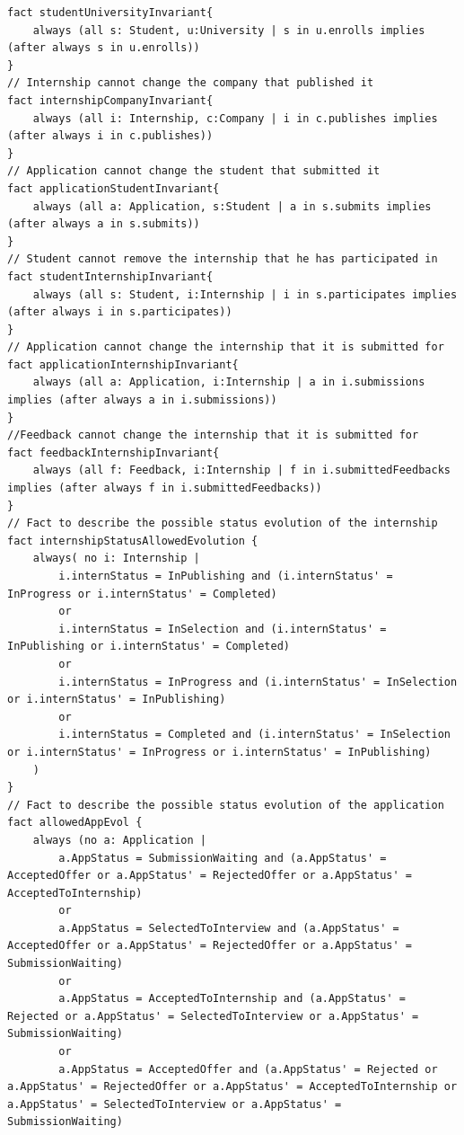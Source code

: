 \begin{lstlisting}
fact studentUniversityInvariant{
    always (all s: Student, u:University | s in u.enrolls implies (after always s in u.enrolls))
}
// Internship cannot change the company that published it
fact internshipCompanyInvariant{
    always (all i: Internship, c:Company | i in c.publishes implies (after always i in c.publishes))
}
// Application cannot change the student that submitted it
fact applicationStudentInvariant{
    always (all a: Application, s:Student | a in s.submits implies (after always a in s.submits))
}
// Student cannot remove the internship that he has participated in
fact studentInternshipInvariant{
    always (all s: Student, i:Internship | i in s.participates implies (after always i in s.participates))
}
// Application cannot change the internship that it is submitted for
fact applicationInternshipInvariant{
    always (all a: Application, i:Internship | a in i.submissions implies (after always a in i.submissions))
}
//Feedback cannot change the internship that it is submitted for
fact feedbackInternshipInvariant{
    always (all f: Feedback, i:Internship | f in i.submittedFeedbacks implies (after always f in i.submittedFeedbacks))
}
// Fact to describe the possible status evolution of the internship
fact internshipStatusAllowedEvolution {
    always( no i: Internship | 
        i.internStatus = InPublishing and (i.internStatus' = InProgress or i.internStatus' = Completed)
        or
        i.internStatus = InSelection and (i.internStatus' = InPublishing or i.internStatus' = Completed)
        or
        i.internStatus = InProgress and (i.internStatus' = InSelection or i.internStatus' = InPublishing)
        or
        i.internStatus = Completed and (i.internStatus' = InSelection or i.internStatus' = InProgress or i.internStatus' = InPublishing)
    )
}
// Fact to describe the possible status evolution of the application
fact allowedAppEvol {
    always (no a: Application | 
        a.AppStatus = SubmissionWaiting and (a.AppStatus' = AcceptedOffer or a.AppStatus' = RejectedOffer or a.AppStatus' = AcceptedToInternship)
        or
        a.AppStatus = SelectedToInterview and (a.AppStatus' = AcceptedOffer or a.AppStatus' = RejectedOffer or a.AppStatus' = SubmissionWaiting)
        or
        a.AppStatus = AcceptedToInternship and (a.AppStatus' = Rejected or a.AppStatus' = SelectedToInterview or a.AppStatus' = SubmissionWaiting)
        or
        a.AppStatus = AcceptedOffer and (a.AppStatus' = Rejected or a.AppStatus' = RejectedOffer or a.AppStatus' = AcceptedToInternship or a.AppStatus' = SelectedToInterview or a.AppStatus' = SubmissionWaiting)

\end{lstlisting}
